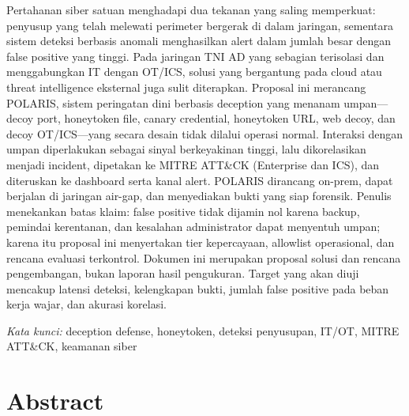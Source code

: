 \documentclass[12pt,a4paper]{article}
\begin{document}
Pertahanan siber satuan menghadapi dua tekanan yang saling memperkuat: penyusup yang telah melewati perimeter bergerak di dalam jaringan, sementara sistem deteksi berbasis anomali menghasilkan alert dalam jumlah besar dengan false positive yang tinggi. Pada jaringan TNI AD yang sebagian terisolasi dan menggabungkan IT dengan OT/ICS, solusi yang bergantung pada cloud atau threat intelligence eksternal juga sulit diterapkan. Proposal ini merancang POLARIS, sistem peringatan dini berbasis deception yang menanam umpan---decoy port, honeytoken file, canary credential, honeytoken URL, web decoy, dan decoy OT/ICS---yang secara desain tidak dilalui operasi normal. Interaksi dengan umpan diperlakukan sebagai sinyal berkeyakinan tinggi, lalu dikorelasikan menjadi incident, dipetakan ke MITRE ATT\&CK (Enterprise dan ICS), dan diteruskan ke dashboard serta kanal alert. POLARIS dirancang on-prem, dapat berjalan di jaringan air-gap, dan menyediakan bukti yang siap forensik. Penulis menekankan batas klaim: false positive tidak dijamin nol karena backup, pemindai kerentanan, dan kesalahan administrator dapat menyentuh umpan; karena itu proposal ini menyertakan tier kepercayaan, allowlist operasional, dan rencana evaluasi terkontrol. Dokumen ini merupakan proposal solusi dan rencana pengembangan, bukan laporan hasil pengukuran. Target yang akan diuji mencakup latensi deteksi, kelengkapan bukti, jumlah false positive pada beban kerja wajar, dan akurasi korelasi.

\vspace{0.3cm}
\noindent\textit{Kata kunci:} deception defense, honeytoken, deteksi penyusupan, IT/OT, MITRE ATT\&CK, keamanan siber

\vspace{0.7cm}
\section*{Abstract}
\end{document}
